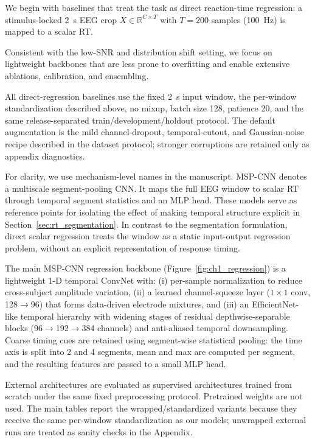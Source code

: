 \documentclass[12pt]{article}
\begin{document}
We begin with baselines that treat the task as direct reaction-time regression: a stimulus-locked 2~s EEG crop $X \in \mathbb{R}^{C \times T}$ with $T=200$ samples (100~Hz) is mapped to a scalar RT.

Consistent with the low-SNR and distribution shift setting, we focus on lightweight backbones that are less prone to overfitting and enable extensive ablations, calibration, and ensembling.

All direct-regression baselines use the fixed 2~s input window, the per-window standardization described above, no mixup, batch size 128, patience 20, and the same release-separated train/development/holdout protocol. The default augmentation is the mild channel-dropout, temporal-cutout, and Gaussian-noise recipe described in the dataset protocol; stronger corruptions are retained only as appendix diagnostics.

For clarity, we use mechanism-level names in the manuscript. MSP-CNN denotes a multiscale segment-pooling CNN. It maps the full EEG window to scalar RT through temporal segment statistics and an MLP head. These models serve as reference points for isolating the effect of making temporal structure explicit in Section~\ref{sec:rt_segmentation}. In contrast to the segmentation formulation, direct scalar regression treats the window as a static input-output regression problem, without an explicit representation of response timing.

The main MSP-CNN regression backbone (Figure~\ref{fig:ch1_regression}) is a lightweight 1-D temporal ConvNet with:
(i) per-sample normalization to reduce cross-subject amplitude variation,
(ii) a learned channel-squeeze layer ($1\times1$ conv, 128$\rightarrow$96) that forms data-driven electrode mixtures,
and (iii) an EfficientNet-like temporal hierarchy with widening stages of residual depthwise-separable blocks
(96$\rightarrow$192$\rightarrow$384 channels) and anti-aliased temporal downsampling.
Coarse timing cues are retained using segment-wise statistical pooling: the time axis is split into 2 and 4 segments,
mean and max are computed per segment, and the resulting features are passed to a small MLP head.

External architectures are evaluated as supervised architectures trained from scratch under the same fixed preprocessing protocol. Pretrained weights are not used. The main tables report the wrapped/standardized variants because they receive the same per-window standardization as our models; unwrapped external runs are treated as sanity checks in the Appendix.
\end{document}
